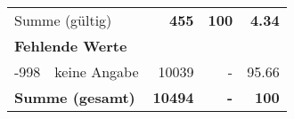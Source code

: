 \begin{longtable}{lXrrr}
     \midrule
     \multicolumn{2}{l}{Summe (gültig)} &
       \textbf{\num{455}} &
     \textbf{\num{100}} &
       \textbf{\num[round-mode=places,round-precision=2]{4.34}} \\
     \multicolumn{5}{l}{\textbf{Fehlende Werte}}\\
       -998 &
       keine Angabe &
         \num{10039} &
        - &
         \num[round-mode=places,round-precision=2]{95.66} \\
     \midrule
     \multicolumn{2}{l}{\textbf{Summe (gesamt)}} &
          \textbf{\num{10494}} &
        \textbf{-} &
        \textbf{\num{100}} \\
     \bottomrule
     \end{longtable}
     
